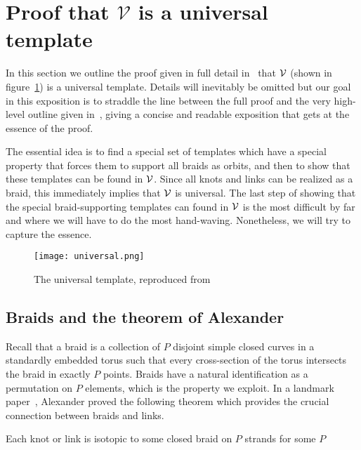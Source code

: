 \documentclass[paper.tex]{subfiles}
\begin{document}
\section{Proof that $\mathcal{V}$ is a universal template}

In this section we outline the proof given in full detail in~\cite{Ghrist1996} that $\mathcal{V}$ (shown in figure~\ref{fig:universal}) is a universal template. Details will inevitably be omitted but our goal in this exposition is to straddle the line between
the full proof and the very high-level outline given in~\cite{knottyode}, giving a concise and readable exposition that gets at the essence of the proof.

The essential idea is to find a special set of templates which have a special property that forces them to support all braids as orbits, and then to show that these templates can be found in $\mathcal{V}$. Since all knots and links
can be realized as a braid, this immediately implies that $\mathcal{V}$ is universal. The last step of showing that the special braid-supporting templates can found in $\mathcal{V}$ is the most difficult by far and where we will have to do the
most hand-waving. Nonetheless, we will try to capture the essence.

\begin{figure}[h]
  \centering
  \texttt{[image: universal.png]}
  \caption{The universal template, reproduced from~\cite{knottyode}}\label{fig:universal}
\end{figure}

\subsection{Braids and the theorem of Alexander}

Recall that a braid is a collection of $P$ disjoint simple closed curves in a standardly embedded torus such that every cross-section of the torus intersects the braid in exactly $P$ points.
Braids have a natural identification as a permutation on $P$ elements, which is the property we exploit. In a landmark paper~\cite{Alexander1923}, Alexander proved the following theorem which provides the crucial connection
between braids and links.


\begin{thm}[Alexander 1923]
  Each knot or link is isotopic to some closed braid on $P$ strands for some $P$
\end{thm}
\end{document}
